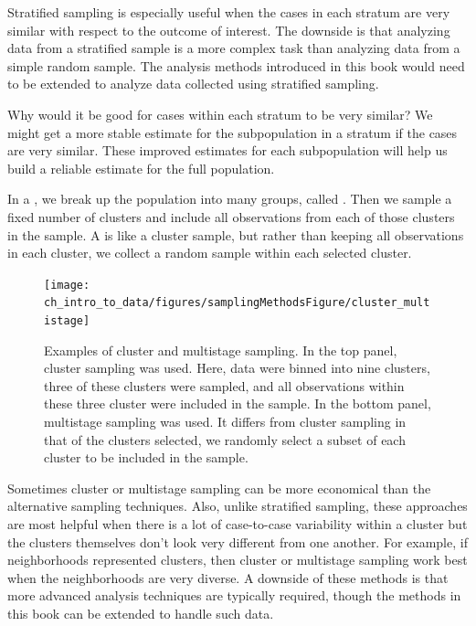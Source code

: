 Stratified sampling is especially useful when the cases in each stratum are very similar with respect to the outcome of interest. The downside is that analyzing data from a stratified sample is a more complex task than analyzing data from a simple random sample. The analysis methods introduced in this book would need to be extended to analyze data collected using stratified sampling.

\begin{example}{Why would it be good for cases within each stratum to be very similar?}
We might get a more stable estimate for the subpopulation in a stratum if the cases are very similar. These improved estimates for each subpopulation will help us build a reliable estimate for the full population.
\end{example}

In a , we break up the population into many groups, called . Then we sample a fixed number of clusters and include all observations from each of those clusters in the sample. A  is like a cluster sample, but rather than keeping all observations in each cluster, we collect a random sample within each selected cluster. %

\begin{figure}
\centering
\texttt{[image: ch\_intro\_to\_data/figures/samplingMethodsFigure/cluster\_multistage]}
\caption{Examples of cluster and multistage sampling. In the top panel, cluster sampling was used. Here, data were binned into nine clusters, three of these clusters were sampled, and all observations within these three cluster were included in the sample. In the bottom panel, multistage sampling was used.
It differs from cluster sampling in that of the clusters selected, we randomly select a subset of each cluster to be included in the sample.}
\label{cluster_multistage}
\end{figure}

Sometimes cluster or multistage sampling can be more economical than the alternative sampling techniques. Also, unlike stratified sampling, these approaches are most helpful when there is a lot of case-to-case variability within a cluster but the clusters themselves don't look very different from one another. For example, if neighborhoods represented clusters, then cluster or multistage sampling work best when the neighborhoods are very diverse. A downside of these methods is that more advanced analysis techniques are typically required, though the methods in this book can be extended to handle such data.

